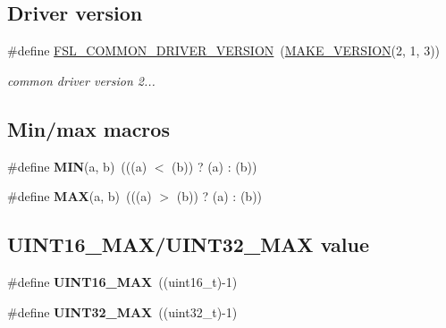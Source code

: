 \subsection*{Driver version}
\begin{DoxyCompactItemize}
\item 
\mbox{\label{group__ksdk__common_gac6e3c4c6fa592fc0da7fab541e7019f7}} 
\#define \mbox{\hyperlink{group__ksdk__common_gac6e3c4c6fa592fc0da7fab541e7019f7}{F\+S\+L\+\_\+\+C\+O\+M\+M\+O\+N\+\_\+\+D\+R\+I\+V\+E\+R\+\_\+\+V\+E\+R\+S\+I\+ON}}~(\mbox{\hyperlink{group__ftfx__utilities_ga812138aa3315b0c6953c1a26130bcc37}{M\+A\+K\+E\+\_\+\+V\+E\+R\+S\+I\+ON}}(2, 1, 3))
\begin{DoxyCompactList}\small\item\em common driver version 2... \end{DoxyCompactList}\end{DoxyCompactItemize}
\subsection*{Min/max macros}
\begin{DoxyCompactItemize}
\item 
\mbox{\label{group__ksdk__common_ga3acffbd305ee72dcd4593c0d8af64a4f}} 
\#define {\bfseries M\+IN}(a,  b)~(((a) $<$ (b)) ? (a) \+: (b))
\item 
\mbox{\label{group__ksdk__common_gafa99ec4acc4ecb2dc3c2d05da15d0e3f}} 
\#define {\bfseries M\+AX}(a,  b)~(((a) $>$ (b)) ? (a) \+: (b))
\end{DoxyCompactItemize}
\subsection*{U\+I\+N\+T16\+\_\+\+M\+A\+X/\+U\+I\+N\+T32\+\_\+\+M\+AX value}
\begin{DoxyCompactItemize}
\item 
\mbox{\label{group__ksdk__common_ga3ea490c9b3617d4479bd80ef93cd5602}} 
\#define {\bfseries U\+I\+N\+T16\+\_\+\+M\+AX}~((uint16\+\_\+t)-\/1)
\item 
\mbox{\label{group__ksdk__common_gab5eb23180f7cc12b7d6c04a8ec067fdd}} 
\#define {\bfseries U\+I\+N\+T32\+\_\+\+M\+AX}~((uint32\+\_\+t)-\/1)
\end{DoxyCompactItemize}
